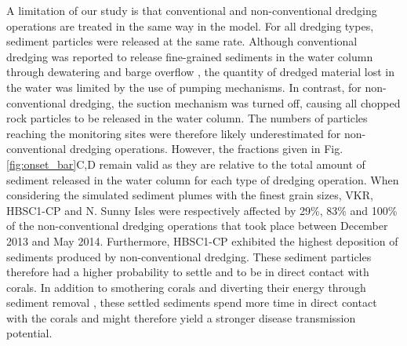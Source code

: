 \documentclass[preprint,12pt,authoryear]{elsarticle}
\begin{document}
A limitation of our study is that conventional and non-conventional dredging operations are treated in the same way in the model. For all dredging types, sediment particles were released at the same rate. Although conventional dredging was reported to release fine-grained sediments in the water column through dewatering and barge overflow \citep{jones2016assessing}, the quantity of dredged material lost in the water was limited by the use of pumping mechanisms. In contrast, for non-conventional dredging, the suction mechanism was turned off, causing all chopped rock particles to be released in the water column. The numbers of particles reaching the monitoring sites were therefore likely underestimated for non-conventional dredging operations. However, the fractions given in Fig. \ref{fig:onset_bar}C,D remain valid as they are relative to the total amount of sediment released in the water column for each type of dredging operation. When considering the simulated sediment plumes with the finest grain sizes, VKR, HBSC1-CP and N. Sunny Isles were respectively affected by 29\%, 83\% and 100\% of the non-conventional dredging operations that took place between December 2013 and May 2014. Furthermore, HBSC1-CP exhibited the highest deposition of sediments produced by non-conventional dredging. These sediment particles therefore had a higher probability to settle and to be in direct contact with corals. In addition to smothering corals and diverting their energy through sediment removal \citep{erftemeijer2012environmental}, these settled sediments spend more time in direct contact with the corals and might therefore yield a stronger disease transmission potential.

\end{document}
